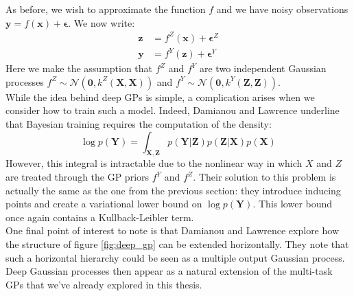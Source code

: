 \documentclass[a4paper,12pt]{article}
\begin{document}
As before, we wish to approximate the function $f$ and we have noisy observations $\mathbf{y} = f(\mathbf{x}) + \boldsymbol{\epsilon}$. We now write:
\begin{equation}
    \begin{aligned}
        \mathbf{z} &= f^Z(\mathbf{x}) + \boldsymbol{\epsilon}^Z\\
        \mathbf{y} &= f^Y(\mathbf{z}) + \boldsymbol{\epsilon}^Y
    \end{aligned}
\end{equation}
Here we make the assumption that $f^Z$ and $f^Y$ are two independent Gaussian processes $f^Z \sim \mathcal{N}(\mathbf{0}, k^Z(\mathbf{X}, \mathbf{X}))$ and $f^Y \sim \mathcal{N}(\mathbf{0}, k^Y(\mathbf{Z}, \mathbf{Z}))$.\\
While the idea behind deep GPs is simple, a complication arises when we consider how to train such a model. Indeed, Damianou and Lawrence underline that Bayesian training requires the computation of the density:
\begin{equation}
    \log{p(\mathbf{Y})} = \int_{\mathbf{X}, \mathbf{Z}} p(\mathbf{Y}|\mathbf{Z}) p(\mathbf{Z}|\mathbf{X})p(\mathbf{X})
 \end{equation}
However, this integral is intractable due to the nonlinear way in which $X$ and $Z$ are treated through the GP priors $f^Y$ and $f^Z$. Their solution to this problem is actually the same as the one from the previous section: they introduce inducing points and create a variational lower bound on $\log{p(\mathbf{Y})}$. This lower bound once again contains a Kullback-Leibler term.\\
One final point of interest to note is that Damianou and Lawrence explore how the structure of figure \ref{fig:deep_gp} can be extended horizontally. They note that such a horizontal hierarchy could be seen as a multiple output Gaussian process. Deep Gaussian processes then appear as a natural extension of the multi-task GPs that we've already explored in this thesis. 
\end{document}
